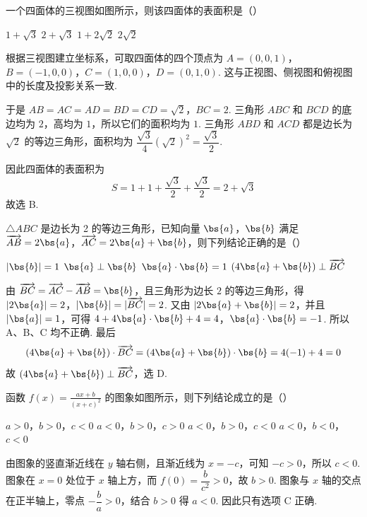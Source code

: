 \begin{problem}
一个四面体的三视图如图所示，则该四面体的表面积是（\quad）


\choices
    {\(1 + \sqrt{3}\)}
    {\(2 + \sqrt{3}\)}
    {\(1 + 2\sqrt{2}\)}
    {\(2\sqrt{2}\)}

\begin{solution}
根据三视图建立坐标系，可取四面体的四个顶点为
\(A=(0,0,1)\)，\(B=(-1,0,0)\)，\(C=(1,0,0)\)，\(D=(0,1,0)\). 这与正视图、侧视图和俯视图中的长度及投影关系一致.

于是
\(AB=AC=AD=BD=CD=\sqrt{2}\)，\(BC=2\).
三角形 \(ABC\) 和 \(BCD\) 的底边均为 \(2\)，高均为 \(1\)，所以它们的面积均为 \(1\). 三角形 \(ABD\) 和 \(ACD\) 都是边长为 \(\sqrt{2}\) 的等边三角形，面积均为
\(\dfrac{\sqrt{3}}{4}(\sqrt{2})^2=\dfrac{\sqrt{3}}{2}\).

因此四面体的表面积为
\[
S=1+1+\frac{\sqrt{3}}{2}+\frac{\sqrt{3}}{2}=2+\sqrt{3}
\]
故选 B.
\end{solution}
\end{problem}

\begin{problem}
\(\triangle ABC\) 是边长为 2 的等边三角形，已知向量 \(\bs{a}\)，\(\bs{b}\) 满足 \(\overrightarrow{AB} = 2\bs{a}\)，\(\overrightarrow{AC} = 2\bs{a} + \bs{b}\)，则下列结论正确的是（\quad）

\choices
    {\(|\bs{b}| = 1\)}
    {\(\bs{a} \perp \bs{b}\)}
    {\(\bs{a} \cdot \bs{b} = 1\)}
    {\((4\bs{a} + \bs{b})\perp \overrightarrow{BC}\)}

\begin{solution}
由 \(\overrightarrow{BC}=\overrightarrow{AC}-\overrightarrow{AB}=\bs{b}\)，且三角形为边长 \(2\) 的等边三角形，得
\(|2\bs{a}|=2\)，\(|\bs{b}|=|\overrightarrow{BC}|=2\).
又由 \(|2\bs{a}+\bs{b}|=2\)，并且 \(|\bs{a}|=1\)，可得
\(4+4\bs{a}\cdot\bs{b}+4=4\)，\(\bs{a}\cdot\bs{b}=-1\).
所以 A、B、C 均不正确. 最后
\[
(4\bs{a}+\bs{b})\cdot\overrightarrow{BC}=(4\bs{a}+\bs{b})\cdot\bs{b}=4(-1)+4=0
\]
故 \((4\bs{a}+\bs{b})\perp\overrightarrow{BC}\)，选 D.
\end{solution}
\end{problem}

\begin{problem}
函数 \( f(x) = \frac{ax + b}{(x + c)^2} \) 的图象如图所示，则下列结论成立的是（\quad）


\choices
    {\(a > 0\)，\(b > 0\)，\(c < 0\)}
    {\(a < 0\)，\(b > 0\)，\(c > 0\)}
    {\(a < 0\)，\(b > 0\)，\(c < 0\)}
    {\(a < 0\)，\(b < 0\)，\(c < 0\)}

\begin{solution}
由图象的竖直渐近线在 \(y\) 轴右侧，且渐近线为 \(x=-c\)，可知 \(-c>0\)，所以 \(c<0\). 图象在 \(x=0\) 处位于 \(x\) 轴上方，而
\(f(0)=\dfrac{b}{c^2}>0\)，故 \(b>0\). 图象与 \(x\) 轴的交点在正半轴上，零点 \(-\dfrac{b}{a}>0\)，结合 \(b>0\) 得 \(a<0\). 因此只有选项 C 正确.
\end{solution}
\end{problem}

